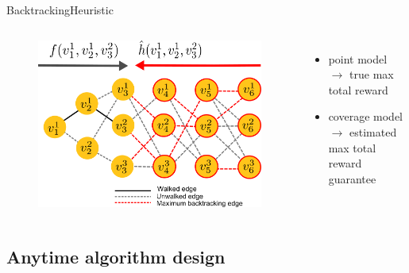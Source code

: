 \begin{frame}{Backtracking}{Heuristic}
	
	\begin{columns}
		
		\begin{minipage}{\textwidth}
			\begin{figure}
				\centering
				\includegraphics[width = \textwidth]{./figure/backtracking}
			\end{figure}
		\end{minipage}
		
		\begin{minipage}{\textwidth}
			\begin{itemize}
				\item point model $ \rightarrow $ true max total reward
				\item coverage model $ \rightarrow $ estimated max total reward guarantee
			\end{itemize}
		\end{minipage}
		
	\end{columns}
	
\end{frame}

\subsection{Anytime algorithm design}

